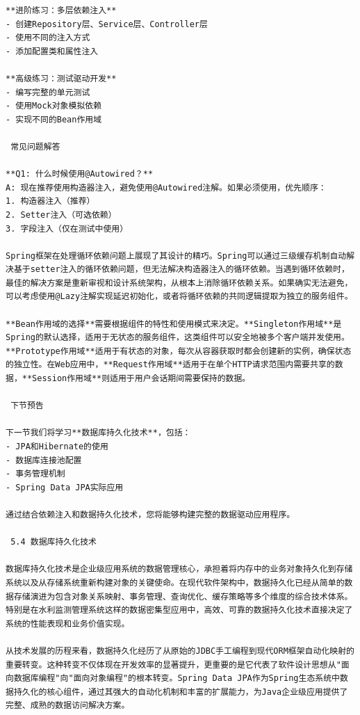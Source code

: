 \begin{lstlisting}
**进阶练习：多层依赖注入**
- 创建Repository层、Service层、Controller层
- 使用不同的注入方式
- 添加配置类和属性注入

**高级练习：测试驱动开发**
- 编写完整的单元测试
- 使用Mock对象模拟依赖
- 实现不同的Bean作用域

 常见问题解答

**Q1: 什么时候使用@Autowired？**
A: 现在推荐使用构造器注入，避免使用@Autowired注解。如果必须使用，优先顺序：
1. 构造器注入（推荐）
2. Setter注入（可选依赖）
3. 字段注入（仅在测试中使用）

Spring框架在处理循环依赖问题上展现了其设计的精巧。Spring可以通过三级缓存机制自动解决基于setter注入的循环依赖问题，但无法解决构造器注入的循环依赖。当遇到循环依赖时，最佳的解决方案是重新审视和设计系统架构，从根本上消除循环依赖关系。如果确实无法避免，可以考虑使用@Lazy注解实现延迟初始化，或者将循环依赖的共同逻辑提取为独立的服务组件。

**Bean作用域的选择**需要根据组件的特性和使用模式来决定。**Singleton作用域**是Spring的默认选择，适用于无状态的服务组件，这类组件可以安全地被多个客户端并发使用。**Prototype作用域**适用于有状态的对象，每次从容器获取时都会创建新的实例，确保状态的独立性。在Web应用中，**Request作用域**适用于在单个HTTP请求范围内需要共享的数据，**Session作用域**则适用于用户会话期间需要保持的数据。

 下节预告

下一节我们将学习**数据库持久化技术**，包括：
- JPA和Hibernate的使用
- 数据库连接池配置
- 事务管理机制
- Spring Data JPA实际应用

通过结合依赖注入和数据持久化技术，您将能够构建完整的数据驱动应用程序。

 5.4 数据库持久化技术

数据库持久化技术是企业级应用系统的数据管理核心，承担着将内存中的业务对象持久化到存储系统以及从存储系统重新构建对象的关键使命。在现代软件架构中，数据持久化已经从简单的数据存储演进为包含对象关系映射、事务管理、查询优化、缓存策略等多个维度的综合技术体系。特别是在水利监测管理系统这样的数据密集型应用中，高效、可靠的数据持久化技术直接决定了系统的性能表现和业务价值实现。

从技术发展的历程来看，数据持久化经历了从原始的JDBC手工编程到现代ORM框架自动化映射的重要转变。这种转变不仅体现在开发效率的显著提升，更重要的是它代表了软件设计思想从"面向数据库编程"向"面向对象编程"的根本转变。Spring Data JPA作为Spring生态系统中数据持久化的核心组件，通过其强大的自动化机制和丰富的扩展能力，为Java企业级应用提供了完整、成熟的数据访问解决方案。


\end{lstlisting}
